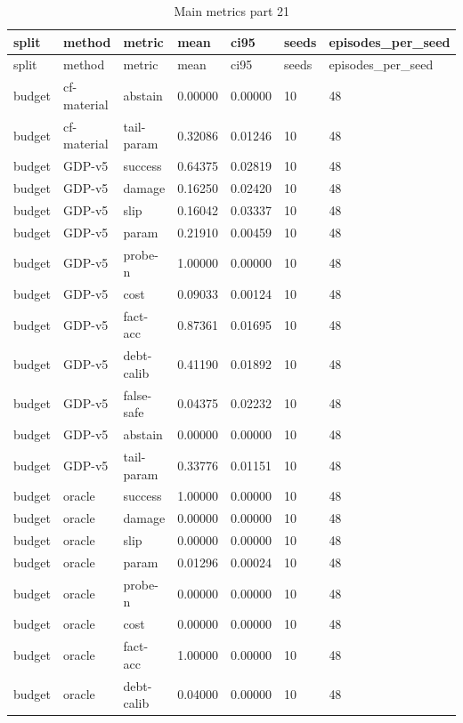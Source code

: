 \documentclass{article}
\begin{document}
\begin{center}
\tiny
\renewcommand{\arraystretch}{0.92}
\setlength{\tabcolsep}{3pt}
\begin{longtable}{lllllll}
\caption{Main metrics part 21}\label{tab:main-metrics-21}\\
\toprule
split & method & metric & mean & ci95 & seeds & episodes\_per\_seed \\
\midrule
\endfirsthead
\toprule
split & method & metric & mean & ci95 & seeds & episodes\_per\_seed \\
\midrule
\endhead
budget & cf-material & abstain & 0.00000 & 0.00000 & 10 & 48 \\
budget & cf-material & tail-param & 0.32086 & 0.01246 & 10 & 48 \\
budget & GDP-v5 & success & 0.64375 & 0.02819 & 10 & 48 \\
budget & GDP-v5 & damage & 0.16250 & 0.02420 & 10 & 48 \\
budget & GDP-v5 & slip & 0.16042 & 0.03337 & 10 & 48 \\
budget & GDP-v5 & param & 0.21910 & 0.00459 & 10 & 48 \\
budget & GDP-v5 & probe-n & 1.00000 & 0.00000 & 10 & 48 \\
budget & GDP-v5 & cost & 0.09033 & 0.00124 & 10 & 48 \\
budget & GDP-v5 & fact-acc & 0.87361 & 0.01695 & 10 & 48 \\
budget & GDP-v5 & debt-calib & 0.41190 & 0.01892 & 10 & 48 \\
budget & GDP-v5 & false-safe & 0.04375 & 0.02232 & 10 & 48 \\
budget & GDP-v5 & abstain & 0.00000 & 0.00000 & 10 & 48 \\
budget & GDP-v5 & tail-param & 0.33776 & 0.01151 & 10 & 48 \\
budget & oracle & success & 1.00000 & 0.00000 & 10 & 48 \\
budget & oracle & damage & 0.00000 & 0.00000 & 10 & 48 \\
budget & oracle & slip & 0.00000 & 0.00000 & 10 & 48 \\
budget & oracle & param & 0.01296 & 0.00024 & 10 & 48 \\
budget & oracle & probe-n & 0.00000 & 0.00000 & 10 & 48 \\
budget & oracle & cost & 0.00000 & 0.00000 & 10 & 48 \\
budget & oracle & fact-acc & 1.00000 & 0.00000 & 10 & 48 \\
budget & oracle & debt-calib & 0.04000 & 0.00000 & 10 & 48 \\

\end{longtable}
\end{center}
\end{document}
